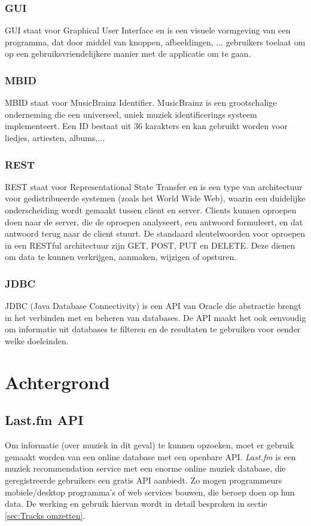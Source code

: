 \documentclass[11pt,a4paper]{article}
\begin{document}
		\subsubsection{GUI}
		\label{sec:GUI}
		GUI staat voor Graphical User Interface en is een visuele vormgeving van een programma, dat door middel van knoppen, afbeeldingen, ... gebruikers toelaat om op een gebruiksvriendelijkere manier met de applicatie om te gaan.
		
		\subsubsection{MBID}
		\label{sec:MBID}
		MBID staat voor MusicBrainz Identifier. MusicBrainz is een grootschalige onderneming die een universeel, uniek muziek identificerings systeem implementeert. Een ID bestaat uit 36 karakters en kan gebruikt worden voor liedjes, artiesten, albums,...
	
		\subsubsection{REST}
		\label{sec:REST}
		REST staat voor Representational State Transfer en is een type van architectuur voor gedistribueerde systemen (zoals het World Wide Web), waarin een duidelijke onderscheiding wordt gemaakt tussen client en server. Clients kunnen oproepen doen naar de server, die de oproepen analyseert, een antwoord formuleert, en dat antwoord terug naar de client stuurt. De standaard sleutelwoorden voor oproepen in een RESTful architectuur zijn GET, POST, PUT en DELETE. Deze dienen om data te kunnen verkrijgen, aanmaken, wijzigen of opsturen.
		
		\subsubsection{JDBC}
		JDBC (Java Database Connectivity) is een API van Oracle die abstractie brengt in het verbinden met en beheren van databases. De API maakt het ook eenvoudig om informatie uit databases te filteren en de resultaten te gebruiken voor eender welke doeleinden.
		
\section{Achtergrond}
\label{sec:Achtergrond}
	\subsection{Last.fm API}
	\label{sec:Last.fm API}
Om informatie (over muziek in dit geval) te kunnen opzoeken, moet er gebruik gemaakt worden van een online database met een openbare API. \textit{Last.fm} is een muziek recommendation service met een enorme online muziek database, die geregistreerde gebruikers een gratis API aanbiedt. Zo mogen programmeurs mobiele/desktop programma's of web services bouwen, die beroep doen op hun data. De werking en gebruik hiervan wordt in detail besproken in sectie \ref{sec:Tracks omzetten}.
\end{document}
